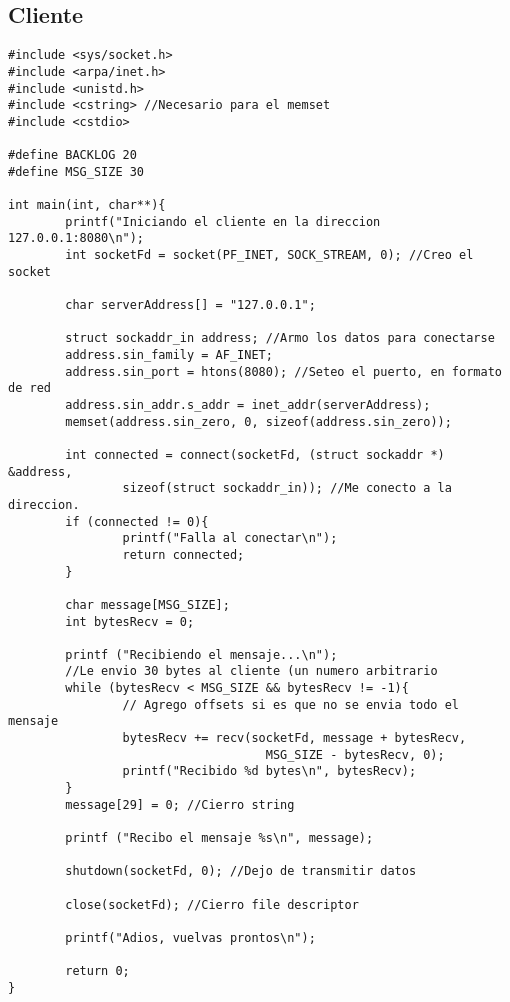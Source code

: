 \documentclass[oneside]{article}
\numberwithin{equation}{section}
\numberwithin{figure}{section}
\numberwithin{table}{section}
\begin{document}
		\subsection{Cliente}
		\begin{lstlisting}
#include <sys/socket.h>
#include <arpa/inet.h>
#include <unistd.h>
#include <cstring> //Necesario para el memset
#include <cstdio>

#define BACKLOG 20
#define MSG_SIZE 30

int main(int, char**){
		printf("Iniciando el cliente en la direccion 127.0.0.1:8080\n");
		int socketFd = socket(PF_INET, SOCK_STREAM, 0); //Creo el socket

		char serverAddress[] = "127.0.0.1";

		struct sockaddr_in address; //Armo los datos para conectarse
		address.sin_family = AF_INET;
		address.sin_port = htons(8080); //Seteo el puerto, en formato de red
		address.sin_addr.s_addr = inet_addr(serverAddress);
		memset(address.sin_zero, 0, sizeof(address.sin_zero));

		int connected = connect(socketFd, (struct sockaddr *) &address,
				sizeof(struct sockaddr_in)); //Me conecto a la direccion.
		if (connected != 0){
				printf("Falla al conectar\n");
				return connected;
		}

		char message[MSG_SIZE];
		int bytesRecv = 0;

		printf ("Recibiendo el mensaje...\n");
		//Le envio 30 bytes al cliente (un numero arbitrario
		while (bytesRecv < MSG_SIZE && bytesRecv != -1){
				// Agrego offsets si es que no se envia todo el mensaje
				bytesRecv += recv(socketFd, message + bytesRecv,
									MSG_SIZE - bytesRecv, 0); 
				printf("Recibido %d bytes\n", bytesRecv);
		}
		message[29] = 0; //Cierro string

		printf ("Recibo el mensaje %s\n", message);

		shutdown(socketFd, 0); //Dejo de transmitir datos

		close(socketFd); //Cierro file descriptor

		printf("Adios, vuelvas prontos\n");

		return 0;
}
		\end{lstlisting}
\pagebreak
\end{document}
